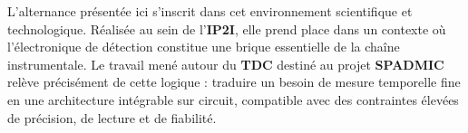 L’alternance présentée ici s’inscrit dans cet environnement scientifique et technologique. Réalisée au sein de l’\textbf{IP2I}, elle prend place dans un contexte où l’électronique de détection constitue une brique essentielle de la chaîne instrumentale. Le travail mené autour du \textbf{TDC} destiné au projet \textbf{SPADMIC} relève précisément de cette logique : traduire un besoin de mesure temporelle fine en une architecture intégrable sur circuit, compatible avec des contraintes élevées de précision, de lecture et de fiabilité.

\clearpage
